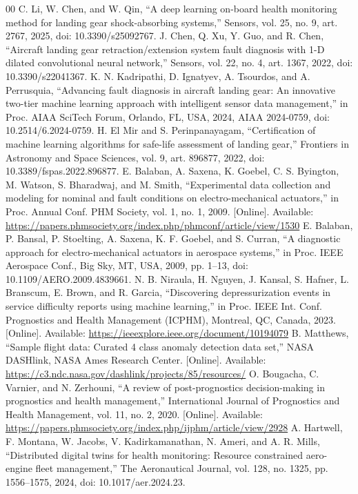 \documentclass[conference]{IEEEtran}
\begin{document}
\begin{thebibliography}{00}
 C. Li, W. Chen, and W. Qin, ``A deep learning on-board health monitoring method for landing gear shock-absorbing systems,'' Sensors, vol. 25, no. 9, art. 2767, 2025, doi: 10.3390/s25092767.
 J. Chen, Q. Xu, Y. Guo, and R. Chen, ``Aircraft landing gear retraction/extension system fault diagnosis with 1-D dilated convolutional neural network,'' Sensors, vol. 22, no. 4, art. 1367, 2022, doi: 10.3390/s22041367.
 K. N. Kadripathi, D. Ignatyev, A. Tsourdos, and A. Perrusquia, ``Advancing fault diagnosis in aircraft landing gear: An innovative two-tier machine learning approach with intelligent sensor data management,'' in Proc. AIAA SciTech Forum, Orlando, FL, USA, 2024, AIAA 2024-0759, doi: 10.2514/6.2024-0759.
 H. El Mir and S. Perinpanayagam, ``Certification of machine learning algorithms for safe-life assessment of landing gear,'' Frontiers in Astronomy and Space Sciences, vol. 9, art. 896877, 2022, doi: 10.3389/fspas.2022.896877.
 E. Balaban, A. Saxena, K. Goebel, C. S. Byington, M. Watson, S. Bharadwaj, and M. Smith, ``Experimental data collection and modeling for nominal and fault conditions on electro-mechanical actuators,'' in Proc. Annual Conf. PHM Society, vol. 1, no. 1, 2009. [Online]. Available: \url{https://papers.phmsociety.org/index.php/phmconf/article/view/1530}
 E. Balaban, P. Bansal, P. Stoelting, A. Saxena, K. F. Goebel, and S. Curran, ``A diagnostic approach for electro-mechanical actuators in aerospace systems,'' in Proc. IEEE Aerospace Conf., Big Sky, MT, USA, 2009, pp. 1--13, doi: 10.1109/AERO.2009.4839661.
 N. B. Niraula, H. Nguyen, J. Kansal, S. Hafner, L. Branscum, E. Brown, and R. Garcia, ``Discovering depressurization events in service difficulty reports using machine learning,'' in Proc. IEEE Int. Conf. Prognostics and Health Management (ICPHM), Montreal, QC, Canada, 2023. [Online]. Available: \url{https://ieeexplore.ieee.org/document/10194079}
 B. Matthews, ``Sample flight data: Curated 4 class anomaly detection data set,'' NASA DASHlink, NASA Ames Research Center. [Online]. Available: \url{https://c3.ndc.nasa.gov/dashlink/projects/85/resources/}
 O. Bougacha, C. Varnier, and N. Zerhouni, ``A review of post-prognostics decision-making in prognostics and health management,'' International Journal of Prognostics and Health Management, vol. 11, no. 2, 2020. [Online]. Available: \url{https://papers.phmsociety.org/index.php/ijphm/article/view/2928}
 A. Hartwell, F. Montana, W. Jacobs, V. Kadirkamanathan, N. Ameri, and A. R. Mills, ``Distributed digital twins for health monitoring: Resource constrained aero-engine fleet management,'' The Aeronautical Journal, vol. 128, no. 1325, pp. 1556--1575, 2024, doi: 10.1017/aer.2024.23.

\end{thebibliography}
\end{document}
